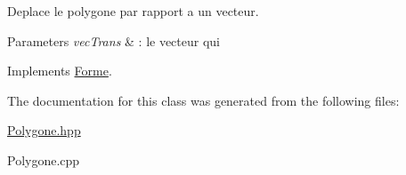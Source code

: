 Deplace le polygone par rapport a un vecteur. 


\begin{DoxyParams}{Parameters}
{\em vec\+Trans} & \+: le vecteur qui \\
\hline
\end{DoxyParams}


Implements \mbox{\hyperlink{class_forme}{Forme}}.



The documentation for this class was generated from the following files\+:\begin{DoxyCompactItemize}
\item 
\mbox{\hyperlink{_polygone_8hpp}{Polygone.\+hpp}}\item 
Polygone.\+cpp\end{DoxyCompactItemize}
